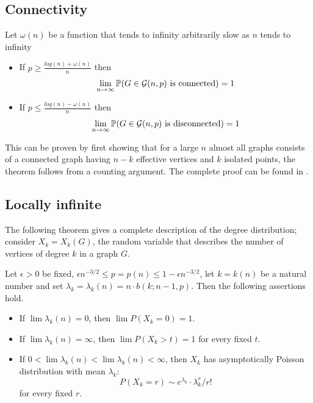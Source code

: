 \subsection{Connectivity}
\begin{theorem}
Let $\omega(n)$ be a function that tends to infinity arbitrarily slow as $n$ tends to infinity
\begin{itemize}
\item If $p\geq \frac{log(n)+ \omega(n)}{n}$ then 
$$\lim_{n \to \infty} \mathbb{P}(G \in \mathcal{G}(n,p) \text{ is connected}) = 1$$
\item If $p\leq \frac{log(n)- \omega(n)}{n}$ then
$$\lim_{n \to \infty} \mathbb{P}(G \in \mathcal{G}(n,p) \text{ is disconnected}) = 1$$
\end{itemize}
\end{theorem}
 
This can be proven by first showing that for a large $n$ almost all graphs consists of a connected graph having $n-k$ effective vertices and $k$ isolated points, the theorem follows from a counting argument. The complete proof can be found in \cite[Erdös-Rényi, p.~59]{Erdos59}.
 
\subsection{Locally infinite}

The following theorem gives a complete description of the degree distribution; consider $X_{k} = X_{k} (G)$, the random variable that describes the number of vertices of degree $k$ in a graph $G$.

\begin{theorem}
Let $\epsilon>0$ be fixed, $\epsilon n^{-3/2} \leq p = p(n) \leq 1 - \epsilon n^{-3/2}$, let $k = k(n)$ be a natural number and set $\lambda_{k} = \lambda_{k}(n) = n\cdot b(k;n - 1,p)$. Then the following assertions hold.

\begin{itemize}
\item If $\lim \lambda_{k}(n) = 0$, then $\lim P(X_{k} = 0) = 1$. 
\item If $\lim \lambda_{k}(n) = \infty$, then $\lim P(X_{k} > t) = 1$
for every fixed $t$.
\item If $0 < \lim\lambda_{k}(n) < \lim \lambda_{k}(n) < \infty$,
then $X_{k}$ has asymptotically Poisson distribution with mean $\lambda_{k}$: 
$$P(X_{k} = r) \sim e^{\lambda_{k}}\cdot \lambda_{k}^{r}/ r!$$
for every fixed $r$.
\end{itemize}
\end{theorem}

